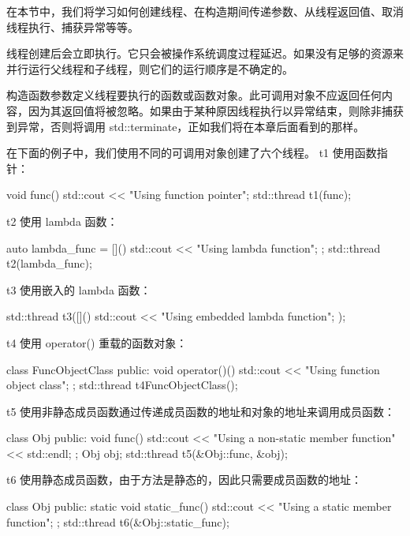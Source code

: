 
在本节中，我们将学习如何创建线程、在构造期间传递参数、从线程返回值、取消线程执行、捕获异常等等。


线程创建后会立即执行。它只会被操作系统调度过程延迟。如果没有足够的资源来并行运行父线程和子线程，则它们的运行顺序是不确定的。

构造函数参数定义线程要执行的函数或函数对象。此可调用对象不应返回任何内容，因为其返回值将被忽略。如果由于某种原因线程执行以异常结束，则除非捕获到异常，否则将调用 std::terminate，正如我们将在本章后面看到的那样。

在下面的例子中，我们使用不同的可调用对象创建了六个线程。
t1 使用函数指针：

\begin{cpp}
void func() {
    std::cout << "Using function pointer\n";
}
std::thread t1(func);
\end{cpp}

t2 使用 lambda 函数：

\begin{cpp}
auto lambda_func = []() {
    std::cout << "Using lambda function\n";
};
std::thread t2(lambda_func);
\end{cpp}

t3 使用嵌入的 lambda 函数：

\begin{cpp}
std::thread t3([]() {
    std::cout << "Using embedded lambda function\n";
});
\end{cpp}

t4 使用 operator() 重载的函数对象：

\begin{cpp}
class FuncObjectClass {
public:
    void operator()() {
        std::cout << "Using function object class\n";
    }
};
std::thread t4{FuncObjectClass()};
\end{cpp}

t5 使用非静态成员函数通过传递成员函数的地址和对象的地址来调用成员函数：

\begin{cpp}
class Obj {
public:
    void func() {
        std::cout << "Using a non-static member function"
                  << std::endl;
    }
};
Obj obj;
std::thread t5(&Obj::func, &obj);
\end{cpp}

t6 使用静态成员函数，由于方法是静态的，因此只需要成员函数的地址：

\begin{cpp}
class Obj {
public:
    static void static_func() {
        std::cout << "Using a static member function\n";
    }
};
std::thread t6(&Obj::static_func);
\end{cpp}


